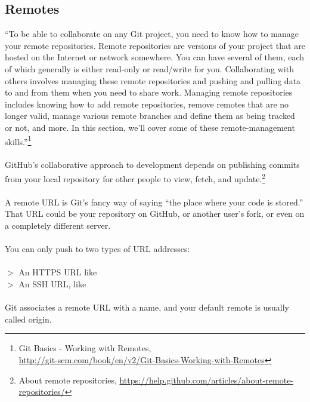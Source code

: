 
\newpage
\subsection{Remotes}
``To be able to collaborate on any Git project, you need to know
how to manage your remote repositories.  Remote repositories are
versions of your project that are hosted on the Internet or
network somewhere.  You can have several of them, each of which
generally is either read-only or read/write for you.
Collaborating with others involves managing these remote
repositories and pushing and pulling data to and from them when
you need to share work.  Managing remote repositories includes
knowing how to add remote repositories, remove remotes that are no
longer valid, manage various remote branches and define them as
being tracked or not, and more. In this section, we'll cover some
of these remote-management skills.''\footnote{Git Basics - Working
with Remotes,\\
\href{http://git-scm.com/book/en/v2/Git-Basics-Working-with-Remotes}{http://git-scm.com/book/en/v2/Git-Basics-Working-with-Remotes}}
\\
\\
\noindent GitHub's collaborative approach to development depends on
publishing commits from your local repository for other people to
view, fetch, and update.\footnote{About remote repositories,
\href{https://help.github.com/articles/about-remote-repositories/}{https://help.github.com/articles/about-remote-repositories/}}
\\
\\
A remote URL is Git's fancy way of saying ``the place where your
code is stored.'' That URL could be your repository on GitHub, or
another user's fork, or even on a completely different server.
\\
\\
You can only push to two types of URL addresses:
\\
\\
$>$ An HTTPS URL like \\
$>$ An SSH URL, like \\
\\
Git associates a remote URL with a name, and your default remote is usually called origin.






